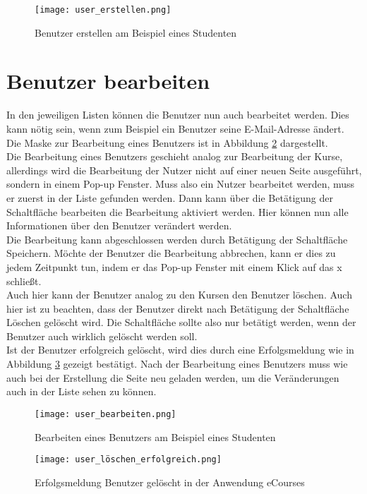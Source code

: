 \begin{figure}[h]
\centering
\texttt{[image: user\_erstellen.png]}
\caption{Benutzer erstellen am Beispiel eines Studenten}
\label{fib:benutzer_erstellen}
\end{figure}

\section{Benutzer bearbeiten}
In den jeweiligen Listen können die Benutzer nun auch bearbeitet werden. Dies kann nötig sein, wenn zum Beispiel ein Benutzer seine E-Mail-Adresse ändert. Die Maske zur Bearbeitung eines Benutzers ist in Abbildung \ref{fib:user_bearbeiten} dargestellt.\\
Die Bearbeitung eines Benutzers geschieht analog zur Bearbeitung der Kurse, allerdings wird die Bearbeitung der Nutzer nicht auf einer neuen Seite ausgeführt, sondern in einem Pop-up Fenster. Muss also ein Nutzer bearbeitet werden, muss er zuerst in der Liste gefunden werden. Dann kann über die Betätigung der Schaltfläche \glqq bearbeiten\grqq\: die Bearbeitung aktiviert werden. Hier können nun alle Informationen über den Benutzer verändert werden.\\ Die Bearbeitung kann abgeschlossen werden durch Betätigung der Schaltfläche \glqq Speichern\grqq . Möchte der Benutzer die Bearbeitung abbrechen, kann er dies zu jedem  Zeitpunkt tun, indem er das Pop-up Fenster mit einem Klick auf das \glqq x\grqq\: schließt.\\
Auch hier kann der Benutzer analog zu den Kursen den Benutzer löschen. Auch hier ist zu beachten, dass der Benutzer direkt nach Betätigung der Schaltfläche \glqq Löschen\grqq\: gelöscht wird. Die Schaltfläche sollte also nur betätigt werden, wenn der Benutzer auch wirklich gelöscht werden soll.\\
Ist der Benutzer erfolgreich gelöscht, wird dies durch eine Erfolgsmeldung wie in Abbildung \ref{fib:user_löschen} gezeigt bestätigt.
Nach der Bearbeitung eines Benutzers muss wie auch bei der Erstellung die Seite neu geladen werden, um die Veränderungen auch in der Liste sehen zu können.\\

\begin{figure}[h]
\centering
\texttt{[image: user\_bearbeiten.png]}
\caption{Bearbeiten eines Benutzers am Beispiel eines Studenten}
\label{fib:user_bearbeiten}
\end{figure}

\begin{figure}[h]
\centering
\texttt{[image: user\_löschen\_erfolgreich.png]}
\caption{Erfolgsmeldung Benutzer gelöscht in der Anwendung eCourses}
\label{fib:user_löschen}
\end{figure}